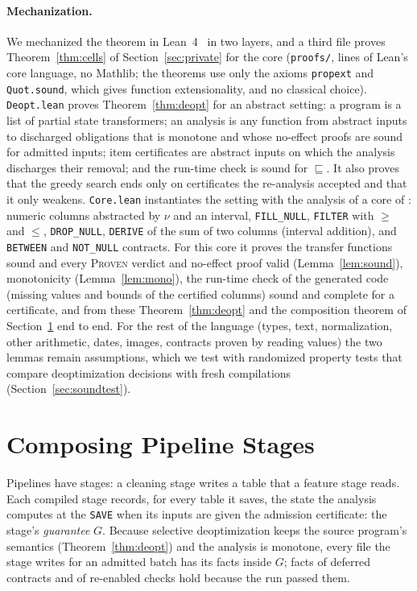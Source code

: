 \paragraph{Mechanization.} We mechanized the theorem in Lean~4~\cite{lean4} in two layers, and a third
file proves Theorem~\ref{thm:cells} of Section~\ref{sec:private} for the core
(\texttt{proofs/}, \LeanLines{} lines of Lean's core language, no Mathlib; the theorems use only the axioms
\texttt{propext} and \texttt{Quot.sound}, which gives function extensionality, and no classical choice). \texttt{Deopt.lean} proves
Theorem~\ref{thm:deopt} for an abstract setting: a program is a list of partial state transformers; an
analysis is any function from abstract inputs to discharged obligations that is monotone and whose
no-effect proofs are sound for admitted inputs; item certificates are abstract inputs on which the
analysis discharges their removal; and the run-time check is sound for $\sqsubseteq$. It also proves
that the greedy search ends only on certificates the re-analysis accepted and that it only weakens.
\texttt{Core.lean} instantiates the setting with the analysis of a core of \PL: numeric columns
abstracted by $\nu$ and an interval, \texttt{FILL\_NULL}, \texttt{FILTER} with $\geq$ and $\leq$,
\texttt{DROP\_NULL}, \texttt{DERIVE} of the sum of two columns (interval addition), and \texttt{BETWEEN}
and \texttt{NOT\_NULL} contracts. For this core it proves the
transfer functions sound and every \textsc{Proven} verdict and no-effect proof valid
(Lemma~\ref{lem:sound}), monotonicity (Lemma~\ref{lem:mono}), the run-time check of the generated code
(missing values and bounds of the certified columns) sound and complete for a certificate, and from
these Theorem~\ref{thm:deopt} and the composition theorem of Section~\ref{sec:compose} end to end. For
the rest of the language (types, text, normalization, other arithmetic, dates, images, contracts
proven by reading values) the
two lemmas remain assumptions, which we test with randomized property tests that compare
deoptimization decisions with fresh compilations (Section~\ref{sec:soundtest}).

\section{Composing Pipeline Stages}\label{sec:compose}

Pipelines have stages: a cleaning stage writes a table that a feature stage reads. Each compiled
stage records, for every table it saves, the state the analysis computes at the \texttt{SAVE} when
its inputs are given the admission certificate: the stage's \emph{guarantee} $G$. Because selective
deoptimization keeps the source program's semantics (Theorem~\ref{thm:deopt}) and the analysis is
monotone, every file the stage writes for an admitted batch has its facts inside $G$; facts of
deferred contracts and of re-enabled checks hold because the run passed them.

